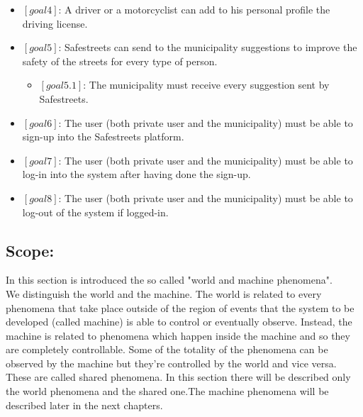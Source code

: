 \documentclass[titlepage]{article}
\begin{document}
\begin{itemize}
\item $[goal 4]$: A driver or a motorcyclist can add to his 					  personal profile the driving license.\\

\item $[goal 5]$: Safestreets can send to the municipality 						  suggestions to improve the safety of the 					      streets for every type of person.
	\begin{itemize}
	\item $[goal 5.1]$: The municipality must receive every 
					    suggestion sent by Safestreets.\\
					   
	
	\end{itemize}
\item $[goal 6]$: The user (both private user and the municipality) must be able to sign-up into the Safestreets platform.
\item $[goal 7]$: The user (both private user and the municipality) must be able to log-in into the system after having done the sign-up.
\item $[goal 8]$: The user (both private user and the municipality) must be able to log-out of the system if logged-in.
\end{itemize}

\subsection{Scope:}
In this section is introduced the so called "world and machine phenomena".\\
We distinguish the world and the machine. The world is related to every phenomena that take place outside of the region of events that the system to be developed (called machine) is able to control or eventually observe. Instead, the machine is related to phenomena which happen inside the machine and so they are completely controllable. Some of the totality of the phenomena can be observed by the machine but they're controlled by the world and vice versa. These are called shared phenomena. In this section there will be described only the world phenomena and the shared one.The machine phenomena will be described later in the next chapters.
\end{document}
